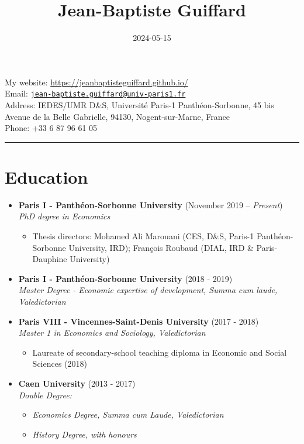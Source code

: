 \documentclass[
]{article}
\title{Jean-Baptiste Guiffard}
\author{}
\date{\vspace{-2.5em}2024-05-15}
\providecommand{\tightlist}{%
  \setlength{\itemsep}{0pt}\setlength{\parskip}{0pt}}
\begin{document}
\maketitle

My website: \url{https://jeanbaptisteguiffard.github.io/}\\
Email:
\href{mailto:jean-baptiste.guiffard@univ-paris1.fr}{\nolinkurl{jean-baptiste.guiffard@univ-paris1.fr}}\\
Address: IEDES/UMR D\&S, Université Paris-1 Panthéon-Sorbonne, 45 bis
Avenue de la Belle Gabrielle, 94130, Nogent-sur-Marne, France\\
Phone: +33 6 87 96 61 05

\begin{center}\rule{0.5\linewidth}{0.5pt}\end{center}

\section{Education}\label{education}

\begin{itemize}
\item
  \textbf{Paris I - Panthéon-Sorbonne University} (November 2019 --
  \emph{Present})\\
  \emph{PhD degree in Economics}

  \begin{itemize}
  \tightlist
  \item
    Thesis directors: Mohamed Ali Marouani (CES, D\&S, Paris-1
    Panthéon-Sorbonne University, IRD); François Roubaud (DIAL, IRD \&
    Paris-Dauphine University)
  \end{itemize}
\item
  \textbf{Paris I - Panthéon-Sorbonne University} (2018 - 2019)\\
  \emph{Master Degree - Economic expertise of development, Summa cum
  laude, Valedictorian}
\item
  \textbf{Paris VIII - Vincennes-Saint-Denis University} (2017 - 2018)\\
  \emph{Master 1 in Economics and Sociology, Valedictorian}

  \begin{itemize}
  \tightlist
  \item
    Laureate of secondary-school teaching diploma in Economic and Social
    Sciences (2018)
  \end{itemize}
\item
  \textbf{Caen University} (2013 - 2017)\\
  \emph{Double Degree:}

  \begin{itemize}
  \tightlist
  \item
    \emph{Economics Degree, Summa cum Laude, Valedictorian}
  \item
    \emph{History Degree, with honours}
  \end{itemize}
\end{itemize}
\end{document}
